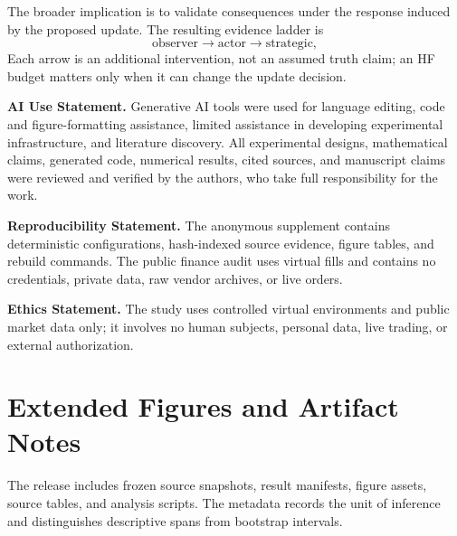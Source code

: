 \documentclass{article}
\begin{document}
The broader implication is to validate consequences under the response induced
by the proposed update. The resulting evidence ladder is
\begin{equation}
  \text{observer} \longrightarrow \text{actor} \longrightarrow \text{strategic},
\end{equation}
Each arrow is an additional intervention, not an assumed truth claim; an HF
budget matters only when it can change the update decision.\label{main:end}

\begingroup\scriptsize
\noindent\textbf{AI Use Statement.} Generative AI tools were used for language
editing, code and figure-formatting assistance, limited assistance in developing
experimental infrastructure, and literature discovery.  All experimental
designs, mathematical claims, generated code, numerical results, cited sources,
and manuscript claims were reviewed and verified by the authors, who take full
responsibility for the work.
\par\noindent\textbf{Reproducibility Statement.} The anonymous supplement
contains deterministic configurations, hash-indexed source evidence, figure
tables, and rebuild commands.  The public finance audit uses virtual fills and
contains no credentials, private data, raw vendor archives, or live orders.
\par\noindent\textbf{Ethics Statement.} The study uses controlled virtual
environments and public market data only; it involves no human subjects,
personal data, live trading, or external authorization.
\endgroup

\label{refs:start}



\clearpage
\appendix
\section{Extended Figures and Artifact Notes}\label{app:artifact}
The release includes frozen source snapshots, result manifests, figure assets,
source tables, and analysis scripts. The metadata records the unit of inference
and distinguishes descriptive spans from bootstrap intervals.
\end{document}
